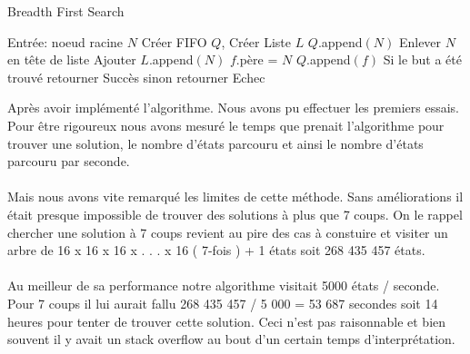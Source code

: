 \documentclass{article}
\begin{document}
\begin{algorithm}
\caption{Breadth First Search}
\label{alg:bfs-reach}
\begin{algorithmic}[1]
  \STATE Entrée: noeud racine $N$
  \STATE Créer FIFO $Q$, Créer Liste $L$
  \STATE $Q$.append$(N)$
    \STATE Enlever $N$ en tête de liste
    \STATE Ajouter $L$.append$(N)$
      \STATE $f$.père = $N$
      \STATE $Q$.append$(f)$
    \ENDFOR
  \ENDWHILE
  \STATE Si le but a été trouvé retourner Succès sinon retourner Echec

\end{algorithmic}
\end{algorithm}
Après avoir implémenté l'algorithme. Nous avons pu effectuer les premiers essais. Pour être rigoureux nous avons mesuré le temps que prenait l'algorithme pour trouver une solution, le nombre d'états parcouru et ainsi le nombre d'états parcouru par seconde.
\\\\
Mais nous avons vite remarqué les limites de cette méthode. Sans améliorations il était presque impossible de trouver des solutions à plus que 7 coups. On le rappel chercher une solution à 7 coups revient au pire des cas à constuire et visiter un arbre de 16 x 16 x 16 x . . . x 16 ( 7-fois ) + 1 états soit 268 435 457 états.\\\\
Au meilleur de sa performance notre algorithme visitait 5000 états / seconde. Pour 7 coups il lui aurait fallu 268 435 457 / 5 000 = 53 687 secondes soit 14 heures pour tenter de trouver cette solution. Ceci n'est pas raisonnable et bien souvent il y avait un stack overflow au bout d'un certain temps d'interprétation.
\end{document}
